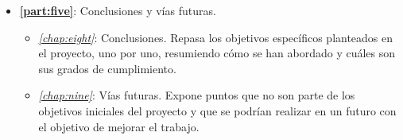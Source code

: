 \begin{itemize}
    \item \textbf{\autoref{part:five}}: Conclusiones y vías futuras.
    \begin{itemize}
        \item \textit{\autoref{chap:eight}}: Conclusiones. Repasa los objetivos específicos planteados en el proyecto, uno por uno, resumiendo cómo se han abordado y cuáles son sus grados de cumplimiento.
        \item \textit{\autoref{chap:nine}}: Vías futuras. Expone puntos que no son parte de los objetivos iniciales del proyecto y que se podrían realizar en un futuro con el objetivo de mejorar el trabajo.
    \end{itemize}
\end{itemize}